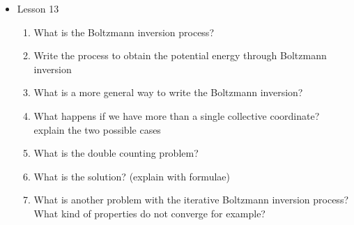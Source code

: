 {\begin{itemize}
    \begin{enumerate}
        \item Which condition should be affirmed?
        \item How can we force U(R) to satisfy that condition?
        \item What is relative entropy?
        \item How do you compute the distance between two distributions? What is the most important probability?
        \item what is the degeneracy factor?
        \item What is the formula for the partition function?
        \item What is the mapping entropy
        \item How do you average the atomic probabilities? what does this allow you to do with the mapping entropy?
        \item When and how does the mapping entropy change?
        \item What do you obtain by mapping in terms of relative entropy?
        \item What formula of relative entropy do you obtain that should be minimized? (Gibbs-Bogoliubov inequality)
        \item What is the potential energy that you have at the minimum of the relative entropy
        \item What is also conserved in case in which the relative entropy is at the minimum?
    \end{enumerate}
    \item Lesson 13
    \begin{enumerate}
        \item What is the Boltzmann inversion process?
        \item Write the process to obtain the potential energy through Boltzmann inversion
        \item What is a more general way to write the Boltzmann inversion?
        \item What happens if we have more  than a single collective coordinate? explain the two possible cases
        \item What is the double counting problem?
        \item What is the solution? (explain with formulae)
        \item What is another problem with the iterative Boltzmann inversion process? What kind of properties do not converge for example?    

\end{enumerate}
\end{itemize}}
